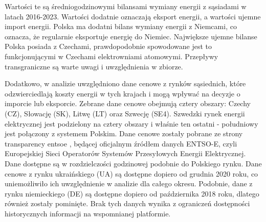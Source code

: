 \begin{table}[H]
    \centering
    \caption{Średni bilans wymiany energii z sąsiadami w latach 2016-2023. Opracowanie własne na podstawie danych PSE.}
    \label{tab:energy-trade-balance}
\end{table}

Wartości te są średniogodzinowymi bilansami wymiany energii z sąsiadami w latach 2016-2023. Wartości dodatnie oznaczają eksport energii, a wartości ujemne import energii. Polska ma dodatni bilans wymiany energii z Niemcami, co oznacza, że regularnie eksportuje energię do Niemiec. Największe ujemne bilanse Polska posiada z Czechami, prawdopodobnie spowodowane jest to funkcjonującymi w Czechami elektrowniami atomowymi. Przepływy transgraniczne są warte uwagi i uwzględnienia w zbiorze.

Dodatkowo, w analizie uwzględniono dane cenowe z rynków sąsiednich, które odzwierciedlają koszty energii w tych krajach i mogą wpływać na decyzje o imporcie lub eksporcie. Zebrane dane cenowe obejmują cztery obszary: Czechy (CZ), Słowację (SK), Litwę (LT) oraz Szwecję (SE4). Szwedzki rynek energii elektrycznej jest podzielony na cztery obszary i właśnie ten ostatni - południowy jest połączony z systemem Polskim. Dane cenowe zostały pobrane ze strony transparency entsoe \cite{transparency_entso}, będącej oficjalnym źródłem danych ENTSO-E, czyli Europejskiej Sieci Operatorów Systemów Przesyłowych Energii Elektrycznej. Dane dostępne są w rozdzielczości godzinowej podobnie do Polskiego rynku. \newline Dane cenowe z rynku ukraińskiego (UA) są dostępne dopiero od grudnia 2020 roku, co uniemożliwiło ich uwzględnienie w analizie dla całego okresu. Podobnie, dane z rynku niemieckiego (DE) są dostępne dopiero od października 2018 roku, dlatego również zostały pominięte. Brak tych danych wynika z ograniczeń dostępności historycznych informacji na wspomnianej platformie.

